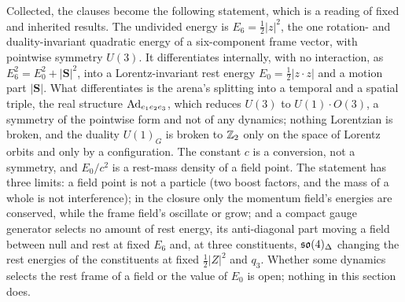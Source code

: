 Collected, the clauses become the following statement, which is a reading of fixed and inherited results. The undivided energy is
$E_6=\tfrac12|z|^2$, the one rotation- and duality-invariant quadratic energy of a six-component frame vector, with pointwise symmetry $U(3)$. It
differentiates internally, with no interaction, as $E_6^2=E_0^2+|\mathbf S|^2$, into a Lorentz-invariant rest energy $E_0=\tfrac12|z\cdot z|$ and a
motion part $|\mathbf S|$. What differentiates is the arena's splitting into a temporal and a spatial triple, the real structure $\operatorname{Ad}_{e_1e_2e_3}$,
which reduces $U(3)$ to $U(1)\cdot O(3)$, a symmetry of the pointwise form and not of any dynamics; nothing Lorentzian is broken, and the duality
$U(1)_G$ is broken to $\mathbb{Z}_2$ only on the space of Lorentz orbits and only by a configuration. The constant $c$ is a conversion, not a symmetry, and
$E_0/c^2$ is a rest-mass density of a field point. The statement has three limits: a field point is not a particle (two boost factors, and the mass of
a whole is not interference); in the closure only the momentum field's energies are conserved, while the frame field's oscillate or grow; and a compact
gauge generator selects no amount of rest energy, its anti-diagonal part moving a field between null and rest at fixed $E_6$ and, at three
constituents, $\mathfrak{so}(4)_\Delta$ changing the rest energies of the constituents at fixed $\tfrac12|Z|^2$ and $q_3$. Whether some dynamics selects the rest
frame of a field or the value of $E_0$ is open; nothing in this section does.
